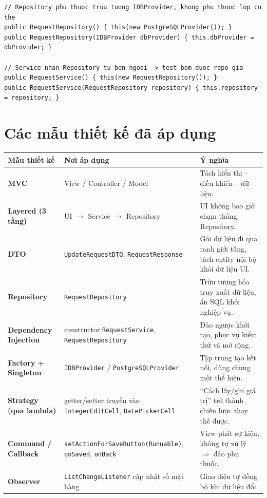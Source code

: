 \documentclass[12pt,a4paper]{article}
\begin{document}
\begin{lstlisting}[caption={Tiêm phụ thuộc qua constructor (DIP)}]
// Repository phu thuoc truu tuong IDBProvider, khong phu thuoc lop cu the
public RequestRepository() { this(new PostgreSQLProvider()); }
public RequestRepository(IDBProvider dbProvider) { this.dbProvider = dbProvider; }

// Service nhan Repository tu ben ngoai -> test bom duoc repo gia
public RequestService() { this(new RequestRepository()); }
public RequestService(RequestRepository repository) { this.repository = repository; }
\end{lstlisting}

\section{Các mẫu thiết kế đã áp dụng}

\begin{longtable}{>{\bfseries}p{3.0cm} p{4.0cm} p{7.8cm}}
\hline
\rowcolor{gray!15}
\normalfont\textbf{Mẫu thiết kế} & \textbf{Nơi áp dụng} & \textbf{Ý nghĩa} \\
\hline
\endhead
MVC & View / Controller / Model & Tách hiển thị -- điều khiển -- dữ liệu. \\
\hline
Layered (3 tầng) & UI $\to$ Service $\to$ Repository & UI không bao giờ chạm thẳng Repository. \\
\hline
DTO & \texttt{UpdateRequestDTO}, \texttt{RequestResponse} & Gói dữ liệu đi qua ranh giới tầng, tách entity nội bộ khỏi dữ liệu UI. \\
\hline
Repository & \texttt{RequestRepository} & Trừu tượng hóa truy xuất dữ liệu, ẩn SQL khỏi nghiệp vụ. \\
\hline
Dependency Injection & constructor \texttt{RequestService}, \texttt{RequestRepository} & Đảo ngược khởi tạo, phục vụ kiểm thử và mở rộng. \\
\hline
Factory + Singleton & \texttt{IDBProvider} / \texttt{PostgreSQLProvider} & Tập trung tạo kết nối, dùng chung một thể hiện. \\
\hline
Strategy (qua lambda) & getter/setter truyền vào \texttt{IntegerEditCell}, \texttt{DatePickerCell} & ``Cách lấy/ghi giá trị'' trở thành chiến lược thay thế được. \\
\hline
Command / Callback & \texttt{setActionForSaveButton(Runnable)}, \texttt{onSaved}, \texttt{onBack} & View phát sự kiện, không tự xử lý $\Rightarrow$ đảo phụ thuộc. \\
\hline
Observer & \texttt{ListChangeListener} cập nhật số mặt hàng & Giao diện tự đồng bộ khi dữ liệu đổi. \\
\hline
\end{longtable}
\end{document}

